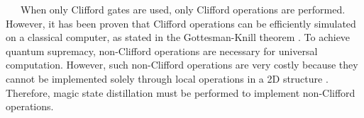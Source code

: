 \documentclass[a4paper,11pt]{ltjsarticle}
\begin{document}
{{        \clearpage

        \ \ \ When only Clifford gates are used, only Clifford operations are performed. However, it has been proven that Clifford operations can be efficiently simulated on a classical computer, as stated in the Gottesman-Knill theorem \cite{gottesman1998}. To achieve quantum supremacy, non-Clifford operations are necessary for universal computation. However, such non-Clifford operations are very costly because they cannot be implemented solely through local operations in a 2D structure \cite{bravyi2012}. Therefore, magic state distillation \cite{litinski2019} must be performed to implement non-Clifford operations.\\
    }
}
\end{document}
